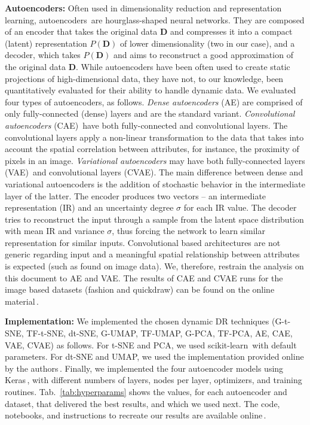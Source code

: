 \noindent\textbf{Autoencoders:} Often used in dimensionality reduction and representation learning, autoencoders\,\citep{aes,Ballard1987} are hourglass-shaped neural networks. They are composed of an encoder that takes the original data $\mathbf{D}$ and compresses it into a compact (latent) representation $P(\mathbf{D})$ of lower dimensionality (two in our case), and a decoder, which takes $P(\mathbf{D})$ and aims to reconstruct a good approximation of the original data $\mathbf{D}$. While autoencoders have been often used to create static projections of high-dimensional data, they have not, to our knowledge, been quantitatively evaluated for their ability to handle dynamic data. We evaluated four types of autoencoders, as follows. \emph{Dense autoencoders} (AE) are comprised of only fully-connected (dense) layers and are the standard variant. \emph{Convolutional autoencoders} (CAE)\,\citep{Masci2011} have both fully-connected and convolutional layers. The convolutional layers apply a non-linear transformation to the data that takes into account the spatial correlation between attributes, for instance, the proximity of pixels in an image. \emph{Variational autoencoders} may have both fully-connected layers (VAE)\,\citep{Kingma2013} and convolutional layers (CVAE). The main difference between dense and variational autoencoders is the addition of stochastic behavior in the intermediate layer of the latter. The encoder produces two vectors -- an intermediate representation (IR) and an uncertainty degree $\sigma$ for each IR value. The decoder tries to reconstruct the input through a sample from the latent space distribution with mean IR and variance $\sigma$, thus forcing the network to learn similar representation for similar inputs.
Convolutional based architectures are not generic regarding input and a meaningful spatial relationship between attributes is expected (such as found on image data). We, therefore, restrain the analysis on this document to AE and VAE. The results of CAE and CVAE runs for the image based datasets (fashion and quickdraw) can be found on the online material\,\citep{repo}.


\noindent\textbf{Implementation:} We implemented the chosen dynamic DR techniques (G-t-SNE, TF-t-SNE, dt-SNE, G-UMAP, TF-UMAP, G-PCA, TF-PCA, AE, CAE, VAE, CVAE) as follows. For t-SNE and PCA, we used scikit-learn\,\citep{scikit-learn} with default parameters. For dt-SNE and UMAP, we used the implementation provided online by the authors\,\citep{Rauber2016,umap}. Finally, we implemented the four autoencoder models using Keras\,\citep{chollet2015keras}, with different numbers of layers, nodes per layer, optimizers, and training routines. Tab.~\ref{tab:hyperparams} shows the values, for each autoencoder and dataset, that delivered the best results, and which we used next. The code, notebooks, and instructions to recreate our results are available online\,\citep{repo}.

